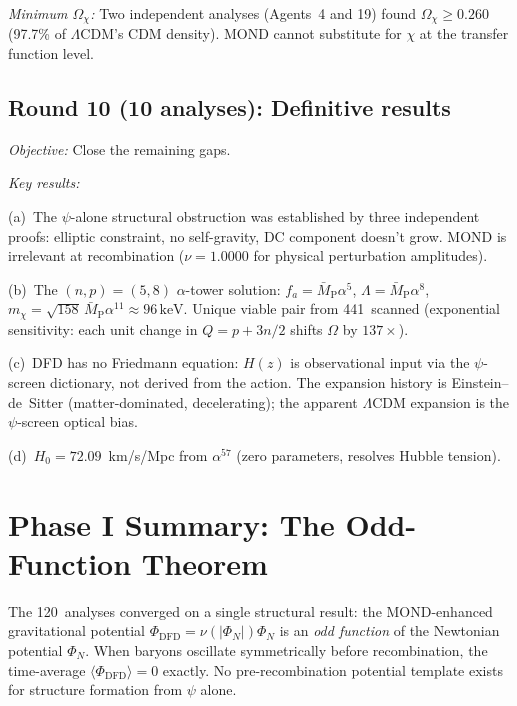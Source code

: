 \documentclass[aps,prd,twocolumn,superscriptaddress,nofootinbib]{revtex4-2}
\newcommand{\keV}{\,\mathrm{keV}}
\newcommand{\LCDM}{\Lambda\mathrm{CDM}}
\begin{document}
\emph{Minimum $\Omega_\chi$:} Two independent analyses
(Agents~4 and 19) found $\Omega_\chi \geq 0.260$
(97.7\% of $\LCDM$'s CDM density). MOND cannot substitute
for $\chi$ at the transfer function level.

\subsection{Round 10 (10 analyses): Definitive results}

\emph{Objective:} Close the remaining gaps.

\emph{Key results:}

(a)~The $\psi$-alone structural obstruction was
established by three independent
proofs: elliptic constraint, no self-gravity, DC component
doesn't grow. MOND is irrelevant at recombination
($\nu = 1.0000$ for physical perturbation amplitudes).

(b)~The $(n,p)=(5,8)$ $\alpha$-tower solution:
$f_a = \bar M_{\mathrm{P}}\alpha^5$,
$\Lambda = \bar M_{\mathrm{P}}\alpha^8$,
$m_\chi = \sqrt{158}\,\bar M_{\mathrm{P}}\alpha^{11}
\approx 96\keV$. Unique viable pair from 441~scanned
(exponential sensitivity: each unit change in $Q=p+3n/2$
shifts $\Omega$ by $137\times$).

(c)~DFD has no Friedmann equation: $H(z)$ is observational
input via the $\psi$-screen dictionary, not derived from
the action. The expansion history is Einstein--de~Sitter
(matter-dominated, decelerating); the apparent $\LCDM$
expansion is the $\psi$-screen optical bias.

(d)~$H_0 = 72.09$~km/s/Mpc from $\alpha^{57}$ (zero
parameters, resolves Hubble tension).

\section{Phase I Summary: The Odd-Function Theorem}
\label{sec:theorem-summary}

The 120~analyses converged on a single structural
result: the MOND-enhanced gravitational potential
$\Phi_{\mathrm{DFD}} = \nu(|\Phi_N|)\Phi_N$ is an
\emph{odd function} of the Newtonian potential $\Phi_N$.
When baryons oscillate symmetrically before recombination,
the time-average $\langle\Phi_{\mathrm{DFD}}\rangle = 0$
exactly. No pre-recombination potential template exists
for structure formation from $\psi$ alone.
\end{document}
